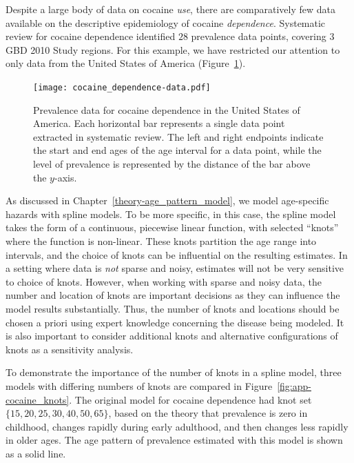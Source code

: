 Despite a large body of data on cocaine \emph{use}, there are comparatively few
data available on the descriptive epidemiology of cocaine
\emph{dependence}.\cite{degenhardt_what_2011} Systematic review for cocaine
dependence identified $28$ prevalence data points,
covering $3$ GBD 2010 Study regions.  For this example, we have restricted our attention
to only data from the United States of America (Figure~\ref{fig:app-cocaine_data}).

    \begin{figure}[h]
        \begin{center}
            \texttt{[image: cocaine\_dependence-data.pdf]}
            \caption{Prevalence data for cocaine dependence in the
              United States of America. Each horizontal bar represents
              a single data point extracted in systematic review.  The
              left and right endpoints indicate the start and end ages
              of the age interval for a data point, while the level of
              prevalence is represented by the distance of the bar
              above the $y$-axis.}
            \label{fig:app-cocaine_data}
        \end{center}
    \end{figure}

As discussed in Chapter~\ref{theory-age_pattern_model}, we model
age-specific hazards with spline models.  To be more specific, in this
case, the spline model takes the form of a continuous, piecewise
linear function, with selected ``knots'' where the function is non-linear.
These knots partition the age range
into intervals, and the choice of knots can be influential on the
resulting estimates.  In a setting where data is \emph{not} sparse and
noisy, estimates will not be very sensitive to choice of knots.
However, when working with sparse and noisy data, the number and
location of knots are important decisions as they can influence the
model results substantially.  Thus, the number of knots and locations
should be chosen a priori using expert knowledge concerning the
disease being modeled.  It is also
important to consider additional knots and alternative configurations
of knots as a sensitivity analysis.

To demonstrate the importance of the number of knots in a spline
model, three models with differing numbers of knots are compared in
Figure~\ref{fig:app-cocaine_knots}.  The original model for cocaine
dependence had knot set $\{15, 20, 25, 30, 40, 50, 65\}$, based on the theory that prevalence is zero in childhood,
changes rapidly during early adulthood, and then changes less rapidly
in older ages.  The age pattern of prevalence estimated with this
model is shown as a solid line.

